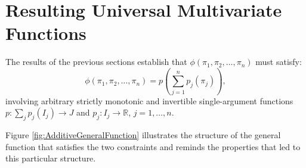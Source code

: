 \section{Resulting Universal Multivariate Functions}

The results of the previous sections establish that $\phi(\pi_1,\pi_2,\ldots,\pi_n)$
must satisfy:
\begin{equation}\label{eq:mainresult}
\boxed{\phi(\pi_1,\pi_2,\ldots,\pi_n) = p\!\left(\sum_{j=1}^n p_j(\pi_j)\right),}
\end{equation}
involving arbitrary strictly monotonic and invertible single-argument functions
$p : \sum_j p_j(I_j) \to J$ and $p_j : I_j \to \mathbb{R}$, $j = 1, \ldots, n$.

Figure \ref{fig:AdditiveGeneralFunction} illustrates the structure of the general function that satisfies the two constraints and reminds the properties that led to this particular structure.

